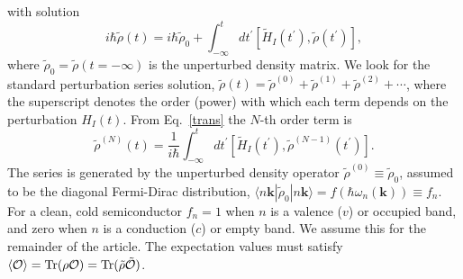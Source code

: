 \documentclass[floatfix,prb,aps,superscriptaddress,11pt,preprint,letterpaper]{revtex4}
\def\chon{red}
\begin{document}
with solution 
\begin{equation}
i\hbar \tilde{{\rho}}(t)=i\hbar \tilde{{\rho}}_{0}+\int_{-\infty }^{t}dt^{\prime }[
\tilde{H}_{I}(t^{\prime }),\tilde{\rho}(t^{\prime })],  
\label{trans}
\end{equation}
where $\tilde{\rho}_{0}=\tilde{\rho}(t=-\infty )$ is the unperturbed density matrix. We look
for the standard perturbation series solution, 
$\tilde{\rho}(t)=\tilde{\rho}^{(0)}+\tilde{\rho}^{(1)}+\tilde{\rho}^{(2)}+\cdots$,  
where the superscript denotes the order (power) with which each term depends
on the perturbation $H_{I}(t)$. From Eq.~\eqref{trans} the $N$-th order
term is 
\begin{equation}
\tilde{{\rho}}^{(N)}(t)=\frac{1}{i\hbar }\int_{-\infty }^{t}dt^{\prime }[\tilde{
H}_{I}(t^{\prime }),\tilde{\rho}^{(N-1)}(t^{\prime })].  
\label{rhop}
\end{equation}
The series is generated by the unperturbed density operator $\tilde{\rho}
^{(0)}\equiv \tilde{\rho}_{0}$, assumed to be the diagonal Fermi-Dirac distribution, 
$\langle n\mathbf{k}|\tilde{\rho}_{0}|n\mathbf{k}\rangle=f(\hbar \omega_{n}(\mathbf{k}))\equiv f_{n}$. For a
clean, cold semiconductor $f_{n}=1$ {\color{\chon} when} $n$ {\color{\chon} is} a valence ($v$) or
occupied band, and zero {\color{\chon} when} $n$ {\color{\chon} is} a conduction ($c$) or empty band.
{\color{\chon} We assume this for the remainder of the article.}
{\color{\chon} T}he expectation values must satisfy
$
\langle{\cal O}\rangle=
\mbox{Tr}({\rho}{\cal O})
=
\mbox{Tr}(\tilde{{\rho}}\tilde{\cal O})
$.  
\end{document}
